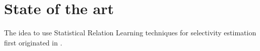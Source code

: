 
\section{State of the art}

The idea to use Statistical Relation Learning techniques for
selectivity estimation first originated in \cite{selectivityPRM}.